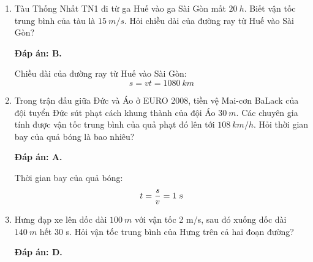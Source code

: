\begin{enumerate}[label=\bfseries Câu \arabic*:]
{	}
	\item {}
	
	
	{Tàu Thống Nhất TN1 đi từ ga Huế vào ga Sài Gòn mất $\SI{20}{h}$. Biết vận tốc trung bình của tàu là $\SI{15}{m/s}$. Hỏi chiều dài của đường ray từ Huế vào Sài Gòn?
	}
	
	\hideall
	{		\textbf{Đáp án: B.}
		
	Chiều dài của đường ray từ Huế vào Sài Gòn:
	$$s=vt=\SI{1080}{km}$$
		
	}
	\item {}
	
	
	{Trong trận đấu giữa Đức và Áo ở EURO 2008, tiền vệ Mai-cơn BaLack của đội tuyển Đức sút phạt cách khung thành của đội Áo $\SI{30}{m}$. Các chuyên gia tính được vận tốc trung bình của quả phạt đó lên tới $\SI{108}{km/h}$. Hỏi thời gian bay của quả bóng là bao nhiêu?
	}
	
	\hideall
	{\textbf{Đáp án: A.}
		
		Thời gian bay của quả bóng:
		$$t=\dfrac{s}{v} = 1\ \text s$$
		
	}
	\item {}
	
	
	{Hưng đạp xe lên dốc dài $\SI{100}{m}$ với vận tốc 2 m/s, sau đó xuống dốc dài $\SI{140}{m}$ hết 30 s. Hỏi vận tốc trung bình của Hưng trên cả hai đoạn đường?
	}
	
	\hideall
	{\textbf{Đáp án: D.}
		
}
\end{enumerate}
